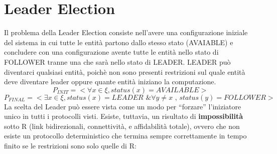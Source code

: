 \chapter{Leader Election}
Il problema della Leader Election consiste nell'avere una configurazione iniziale del sistema in cui tutte le entità partono dallo stesso stato (AVAIABLE) e concludere con una configurazione avente tutte le entità nello stato di FOLLOWER tranne una che sarà nello stato di LEADER.
LEADER può diventarci qualsiasi entità, poichè non sono presenti restrizioni sul quale entità deve diventare leader oppure quante entità iniziano la computazione.
$$P_{INIT}=< \forall x \in \xi, status(x)=AVAILABLE >$$
$$P_{FINAL}=< \exists x \in \xi, status(x)=LEADER \text{ \& } \forall y \neq x \text{ , } status(y)=FOLLOWER >$$
La scelta del Leader può essere vista come un modo per ``forzare'' l'iniziatore unico in tutti i protocolli visti.
Esiste, tuttavia, un risultato di \textbf{impossibilità} sotto R (link bidirezionali, connettività, e affidabilità totale), ovvero che non esiste un protocollo deterministico che termina sempre correttamente in tempo finito se le restrizioni sono solo quelle di R:\\
